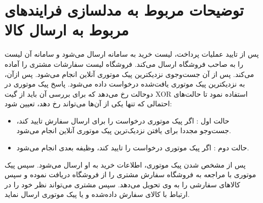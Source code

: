 \documentclass[14pt]{article}
\begin{document}
 
\section{ توضیحات مربوط به مدلسازی فرایندهای مربوط به ارسال کالا}

 
پس از تایید عملیات پرداخت، لیست خرید به سامانه ارسال می‌شود و سامانه آن لیست را به صاحب فروشگاه ارسال می‌کند. فروشگاه لیست سفارشات مشتری را آماده می‌کند. پس از آن جست‌وجوی نزدیکترین پیک موتوری آنلاین انجام می‌شود. پس ازآن، به نزدیکترین پیک موتوری یافت‌شده درخواست داده می‌شود. پاسخ پیک موتوری در دوحالت رخ می‌دهد که برای بررسی آن باید از گیت XOR استفاده نمود تا حالت‌های احتمالی که تنها یکی از آن‌ها می‌تواند رخ دهد، تعیین شود:\\
\begin{flushright}
\begin{itemize}
\item حالت اول : اگر پیک موتوری درخواست را برای ارسال سفارش تایید کند، جست‌و‌جو مجددا برای یافتن نزدیک‌ترین پیک موتوری آنلاین انجام می‌شود.\\
\item حالت دوم : اگر پیک موتوری درخواست را تایید کند، وظیفه بعدی انجام می‌شود.\\
\end{itemize}
\end{flushright}

پس از مشخص شدن پیک موتوری، اطلاعات خرید به او ارسال می‌شود. سپس پیک موتوری با مراجعه به فروشگاه سفارش مشتری را از فروشگاه دریافت نموده و سپس کالاهای سفارشی را به وی تحویل می‌دهد. سپس مشتری می‌تواند نظر خود را در ارتباط با کالای سفارش داده‌شده و یا پیک موتوری ارسال نماید.\\
\end{document}
